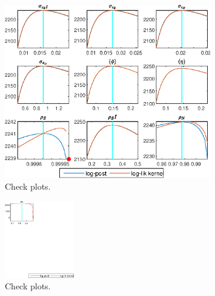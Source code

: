  
\begin{figure}[H]
\centering 
\includegraphics[width=0.80\textwidth]{BRS_est_shopping/graphs/BRS_est_shopping_CheckPlots1}
\caption{Check plots.}\label{Fig:CheckPlots:1}
\end{figure}
 
\begin{figure}[H]
\centering 
\includegraphics[width=0.27\textwidth]{BRS_est_shopping/graphs/BRS_est_shopping_CheckPlots2}
\caption{Check plots.}\label{Fig:CheckPlots:2}
\end{figure}
 
